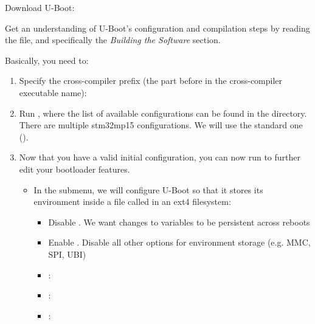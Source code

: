 Download U-Boot:


Get an understanding of U-Boot's configuration and compilation steps
by reading the  file, and specifically the {\em Building
the Software} section.

Basically, you need to:

\begin{enumerate}

\item Specify the cross-compiler prefix
(the part before  in the cross-compiler executable name):

\item Run , where the list of available
  configurations can be found in the  directory. There
  are multiple stm32mp15 configurations. We will use the standard one
  ().

\item Now that you have a valid initial configuration, you can now
  run  to further edit your bootloader features.

  \begin{itemize}

  \item In the  submenu, we will configure U-Boot so
    that it stores its environment inside a file called 
    in an ext4 filesystem:
    \begin{itemize}
    \item Disable . We want changes to variables to
        be persistent across reboots
    \item Enable . Disable all other
        options for environment storage (e.g. MMC, SPI, UBI)
    \item {}: 
    \item {}: 
    \item {}: 
    \end{itemize}


\end{itemize}
\end{enumerate}
